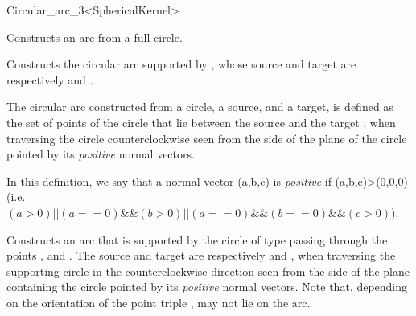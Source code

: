 \begin{ccRefClass}{Circular_arc_3<SphericalKernel>}


\ccIsModel


\ccCreation
{}

\ccThreeToTwo

{Constructs an arc from a full circle.}

{Constructs the circular arc supported by , whose source and target 
are respectively  and .
}

The circular arc constructed from a circle, a source, and a target, is
defined as the set of points of the circle that lie between the source 
and the target , when traversing the circle counterclockwise
seen from the side of the plane of the circle pointed by its \textit{positive} normal 
vectors.

In this definition, we say that a normal vector (a,b,c) is \textit{positive} if 
(a,b,c)>(0,0,0) (i.e. $(a>0) || (a==0) \&\& (b>0) || (a==0)\&\&(b==0)\&\&(c>0)$).

{Constructs an arc that is supported by the circle of type
   passing through the points ,
   and . The source and target are respectively 
  and , when traversing the supporting circle in the
  counterclockwise direction 
  seen from the side of the plane containing the circle pointed by its \textit{positive}
  normal vectors.
  Note that, depending on the orientation of the point triple
  ,  may not lie on the arc. 
}

\ccAccessFunctions

\ccThreeToTwo


\end{ccRefClass}

